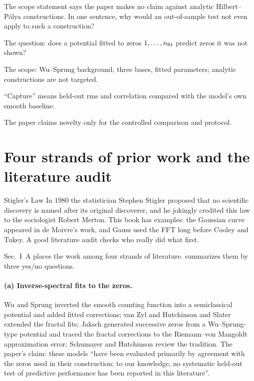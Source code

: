 \begin{checkpoint}
The scope statement says the paper makes no claim against analytic Hilbert--P\'olya constructions. In one sentence, why would an out-of-sample test not even apply to such a construction?
\end{checkpoint}

\begin{keyideas}
\item The question: does a potential fitted to zeros $1,\dots,n_{\rm fit}$ predict zeros it was not shown?
\item The scope: Wu--Sprung background, three bases, fitted parameters; analytic constructions are not targeted.
\item ``Capture'' means held-out rms and correlation compared with the model's own smooth baseline.
\item The paper claims novelty only for the controlled comparison and protocol.
\end{keyideas}

\section{Four strands of prior work and the literature audit}\label{sec:paper-setup-prior}
\begin{didyouknow}{Stigler's Law}
In 1980 the statistician Stephen Stigler proposed that no scientific discovery is named after its original discoverer, and he jokingly credited this law to the sociologist Robert Merton. This book has examples: the Gaussian curve appeared in de Moivre's work, and Gauss used the FFT long before Cooley and Tukey. A good literature audit checks who really did what first.
\end{didyouknow}

Sec.~I~A places the work among four strands of literature.  summarizes them by three yes/no questions.

\paragraph{(a) Inverse-spectral fits to the zeros.} Wu and Sprung \cite{wusprung} inverted the smooth counting function into a semiclassical potential and added fitted corrections; van Zyl and Hutchinson \cite{vanzyl} and Slater \cite{slater} extended the fractal fits; Jaksch \cite{jaksch} generated successive zeros from a Wu--Sprung-type potential and traced the fractal corrections to the Riemann--von Mangoldt approximation error; Schumayer and Hutchinson \cite{schumayer} review the tradition. The paper's claim: these models ``have been evaluated primarily by agreement with the zeros used in their construction; to our knowledge, no systematic held-out test of predictive performance has been reported in this literature''.

